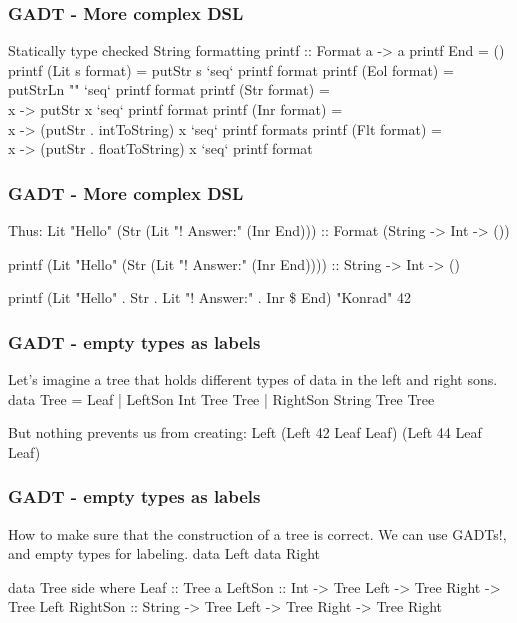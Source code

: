\documentclass{beamer}
\newenvironment{VerbExample}
{\example\semiverbatim}
{\endsemiverbatim\endexample}
\begin{document}
\begin{frame}[fragile]
  \frametitle{GADT - More complex DSL}
Statically type checked String formatting
  \begin{VerbExample}
printf :: Format a -> a
printf End = ()
printf (Lit s format) = putStr s `seq` printf format
printf (Eol format) = putStrLn "" `seq` printf format
printf (Str format) =
  \\x -> putStr x `seq` printf format
printf (Inr format) =
  \\x -> (putStr . intToString) x `seq` printf formats
printf (Flt format) =
  \\x -> (putStr . floatToString) x `seq` printf format
  \end{VerbExample}
\end{frame}

\begin{frame}[fragile]
  \frametitle{GADT - More complex DSL}
Thus:
  \begin{VerbExample}
Lit "Hello" (Str (Lit "! Answer:" (Inr End)))
:: Format (String -> Int -> ())

printf (Lit "Hello" (Str (Lit "! Answer:" (Inr End))))
:: String -> Int -> ()

printf
(Lit "Hello" . Str . Lit "! Answer:" . Inr \$ End)
"Konrad" 42
  \end{VerbExample}
\end{frame}


\begin{frame}[fragile]
  \frametitle{GADT - empty types as labels}

Let's imagine a tree that holds different types of data
in the left and right sons.
  \begin{VerbExample}
data Tree
  = Leaf
  | LeftSon Int Tree Tree
  | RightSon String Tree Tree

But nothing prevents us from creating:
Left (Left 42 Leaf Leaf) (Left 44 Leaf Leaf)

  \end{VerbExample}
\end{frame}

\begin{frame}[fragile]
  \frametitle{GADT - empty types as labels}
How to make sure that the construction of a tree is correct.
We can use GADTs!, and empty types for labeling.
  \begin{VerbExample}
data Left
data Right

data Tree side where
  Leaf :: Tree a
  LeftSon ::
    Int -> Tree Left -> Tree Right -> Tree Left
  RightSon ::
    String -> Tree Left -> Tree Right -> Tree Right
  \end{VerbExample}
\end{frame}
\end{document}

